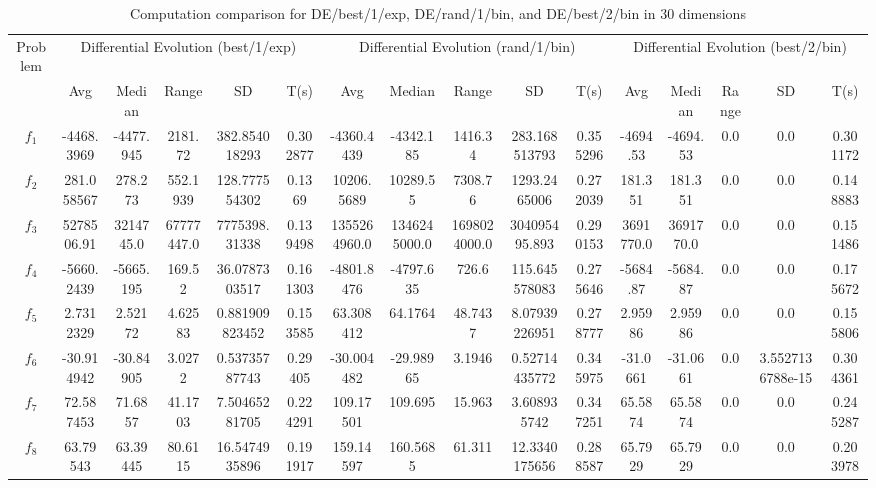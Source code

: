 \documentclass[paper=a4, fontsize=11pt]{scrartcl} %
\numberwithin{equation}{section} %
\numberwithin{figure}{section} %
\numberwithin{table}{section} %
\begin{document}
\begin{landscape}
	\begin{table}
		\tiny
		\centering
		\caption{Computation comparison for DE/best/1/exp, DE/rand/1/bin, and DE/best/2/bin in 30 dimensions}
		\label{Tab1d}
		\begin{tabular}{c|ccccc|ccccc|ccccc}
			\noalign{\smallskip}\hline\noalign{\smallskip}
			Problem & \multicolumn{5}{c}{Differential Evolution (best/1/exp)}& \multicolumn{5}{|c|}{Differential Evolution (rand/1/bin)} &  \multicolumn{5}{c}{Differential Evolution (best/2/bin)} \\ 
			\noalign{\smallskip}\hline\noalign{\smallskip}
			& Avg & Median & Range & SD & T(s) & Avg & Median
			& Range & SD & T(s) & Avg & Median & Range & SD &
			T(s) \\ 
			\noalign{\smallskip}\hline\noalign{\smallskip}
			$f_{1}$ & -4468.3969 & -4477.945 & 2181.72 & 382.854018293 & 0.302877 & -4360.4439 & -4342.185 & 1416.34 & 283.168513793 & 0.355296 & -4694.53 & -4694.53 & 0.0 & 0.0 & 0.301172\\
			$f_{2}$ & 281.058567 & 278.273 & 552.1939 & 128.777554302 & 0.1369 & 10206.5689 & 10289.55 & 7308.76 & 1293.2465006 & 0.272039 & 181.351 & 181.351 & 0.0 & 0.0 & 0.148883\\
			$f_{3}$ & 5278506.91 & 3214745.0 & 67777447.0 & 7775398.31338 & 0.139498 & 1355264960.0 & 1346245000.0 & 1698024000.0 & 304095495.893 & 0.290153 & 3691770.0 & 3691770.0 & 0.0 & 0.0 & 0.151486\\
			$f_{4}$ & -5660.2439 & -5665.195 & 169.52 & 36.0787303517 & 0.161303 & -4801.8476 & -4797.635 & 726.6 & 115.645578083 & 0.275646 & -5684.87 & -5684.87 & 0.0 & 0.0 & 0.175672\\
			$f_{5}$ & 2.7312329 & 2.52172 & 4.62583 & 0.881909823452 & 0.153585 & 63.308412 & 64.1764 & 48.7437 & 8.07939226951 & 0.278777 & 2.95986 & 2.95986 & 0.0 & 0.0 & 0.155806\\
			$f_{6}$ & -30.914942 & -30.84905 & 3.0272 & 0.53735787743 & 0.29405 & -30.004482 & -29.98965 & 3.1946 & 0.52714435772 & 0.345975 & -31.0661 & -31.0661 & 0.0 & 3.5527136788e-15 & 0.304361\\
			$f_{7}$ & 72.587453 & 71.6857 & 41.1703 & 7.50465281705 & 0.224291 & 109.17501 & 109.695 & 15.963 & 3.608935742 & 0.347251 & 65.5874 & 65.5874 & 0.0 & 0.0 & 0.245287\\
			$f_{8}$ & 63.79543 & 63.39445 & 80.6115 & 16.5474935896 & 0.191917 & 159.14597 & 160.5685 & 61.311 & 12.3340175656 & 0.288587 & 65.7929 & 65.7929 & 0.0 & 0.0 & 0.203978\\

\end{tabular}
\end{table}
\end{landscape}
\end{document}

